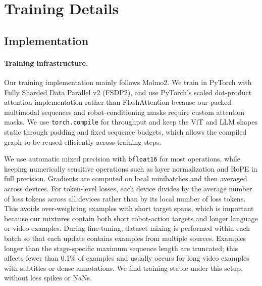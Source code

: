 \section{Training Details}
\label{supp:training}

\subsection{Implementation}
\paragraph{Training infrastructure.}
Our training implementation mainly follows Molmo2. We train in PyTorch with
Fully Sharded Data Parallel v2 (FSDP2), and use PyTorch's scaled dot-product
attention implementation rather than FlashAttention because our packed
multimodal sequences and robot-conditioning masks require custom attention
masks. We use \texttt{torch.compile} for throughput and keep the ViT and LLM
shapes static through padding and fixed sequence budgets, which allows the
compiled graph to be reused efficiently across training steps.

We use automatic mixed precision with \texttt{bfloat16} for most operations,
while keeping numerically sensitive operations such as layer normalization and
RoPE in full precision. Gradients are computed on local minibatches and then
averaged across devices. For token-level losses, each device divides by the
average number of loss tokens across all devices rather than by its local
number of loss tokens. This avoids over-weighting examples with short target
spans, which is important because our mixtures contain both short robot-action
targets and longer language or video examples. During fine-tuning, dataset
mixing is performed within each batch so that each update contains examples
from multiple sources. Examples longer than the stage-specific maximum
sequence length are truncated; this affects fewer than 0.1\% of examples and
usually occurs for long video examples with subtitles or dense annotations. We
find training stable under this setup, without loss spikes or NaNs.

